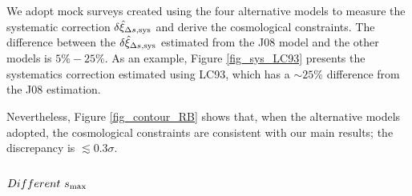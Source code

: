 \documentclass[iop]{emulateapj}
\begin{document}
\begin{figure*}
   \caption{\label{fig_sys_LC93}
   Systematics in $\delta \hat \xi_{\Delta s}$, measured from the HR4 mock galaxies
   with the LC93 model adopted as the merger timescale model.
   Compared with the main result using the merger timescale model J08 (Figure \ref{fig_sys}), 
   there is a $\sim 25\%$ change in the amplitude of $\delta \hat \xi_{\Delta s}$.
   }
\end{figure*}

We adopt mock surveys created using the four alternative models to
measure the systematic correction $\delta \hat\xi_{\Delta s, {\rm sys}}$
and derive the cosmological constraints.
The difference between the $\delta \hat\xi_{\Delta s, {\rm sys}}$ estimated from the J08 model and the other models is $5\%-25\%$.
As an example, Figure \ref{fig_sys_LC93} presents the systematics correction estimated using LC93,
which has a $\sim25\%$ difference from the J08 estimation.

Nevertheless, Figure \ref{fig_contour_RB} shows that, 
when the alternative models adopted, 
the cosmological constraints are consistent with our main results;
the discrepancy is $\lesssim0.3\sigma$.




\subsection{$Different\ s_{\rm max}$}
\end{document}
